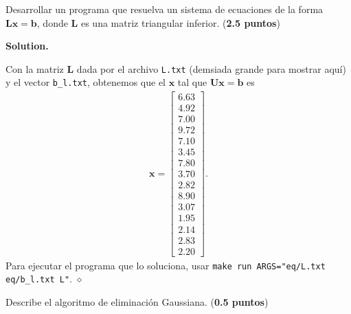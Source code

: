 \documentclass{article}
\theoremstyle{problemstyle}
\newenvironment{solution}{%
  \begin{mdframed}[linewidth=0.8pt,linecolor=Gray,backgroundcolor=Gray!5,roundcorner=5pt]%
  \noindent\textbf{Solution.}%
}{%
\hfill $ \diamond $ 
  \end{mdframed}%
}
\begin{document}
\begin{problem}
Desarrollar un programa que resuelva un sistema de ecuaciones de la forma $\mathbf{Lx} = \mathbf{b}$, donde $ \mathbf{L} $ es una matriz triangular inferior. (\textbf{2.5 puntos})
\end{problem}

\begin{solution}
	Con la matriz $ \mathbf{L} $ dada por el archivo \texttt{L.txt} (demsiada grande para mostrar aqu\'i) y el vector \texttt{b\_l.txt}, obtenemos que el $ \mathbf{x} $ tal que $ \mathbf{Ux} = \mathbf{b} $ es
	\begin{align*}
		\mathbf{x} =
		\begin{bmatrix}
			6.63 \\ 4.92 \\ 7.00 \\ 9.72 \\ 7.10 \\ 3.45 \\ 7.80 \\ 3.70 \\ 2.82 \\ 8.90 \\ 3.07 \\ 1.95 \\ 2.14 \\ 2.83 \\ 2.20
		\end{bmatrix}.
	\end{align*}
	Para ejecutar el programa que lo soluciona, usar \texttt{make run ARGS="eq/L.txt eq/b\_l.txt L"}.
\end{solution}


\begin{problem}
Describe el algoritmo de eliminaci\'on Gaussiana. (\textbf{0.5 puntos})
\end{problem}
\end{document}
